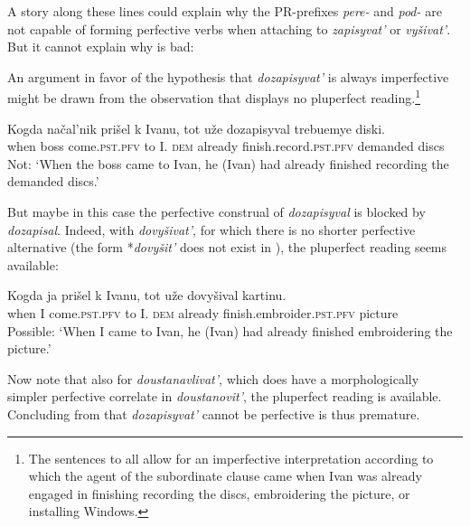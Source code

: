 \documentclass[output=paper,
colorlinks,
citecolor=brown,
newtxmath
]{langscibook}
\begin{document}
\noindent A story along these lines could explain why the PR-prefixes \textit{pere-} and \textit{pod-} are not capable of forming perfective verbs when attaching to \textit{zapisyvat'} or \textit{vyšivat'}. But it cannot explain why  is bad:

\z

\noindent An argument in favor of the hypothesis that \textit{dozapisyvat'} is always imperfective might be drawn from the observation that  displays no pluperfect reading.\footnote{The sentences  to  all allow for an imperfective interpretation according to which the agent of the subordinate clause came when Ivan was already engaged in finishing recording the discs, embroidering the picture, or installing Windows.}

\ea\label{noplusqu}
\gll Kogda načal'nik prišel k Ivanu, tot uže dozapisyval trebuemye diski.\\
when boss come.\textsc{pst.pfv} to I. \textsc{dem} already {finish.record.}\textsc{pst.pfv} demanded discs\\
\glt Not: `When the boss came to Ivan, he (Ivan) had already finished recording the demanded discs.'
\z

\noindent But maybe in this case the perfective construal of \textit{dozapisyval} is blocked by \textit{dozapisal}. Indeed, with \textit{dovyšivat'}, for which there is no shorter perfective alternative (the form *\textit{dovyšit'} does not exist in ), the pluperfect reading seems available:

\ea\label{yesplusqu}
\gll Kogda ja prišel k Ivanu, tot uže dovyšival kartinu.\\
when I come.\textsc{pst.pfv} to I. \textsc{dem} already
{finish.embroider.}\textsc{pst.pfv} picture\\
\glt Possible: `When I came to Ivan, he (Ivan) had already finished embroidering the picture.'
\z

\noindent Now note that also for \textit{doustanavlivat'}, which does have a morphologically simpler perfective correlate in \textit{doustanovit'},
the pluperfect reading is available. Concluding from  that \textit{dozapisyvat'} cannot be perfective is thus premature.
\end{document}
